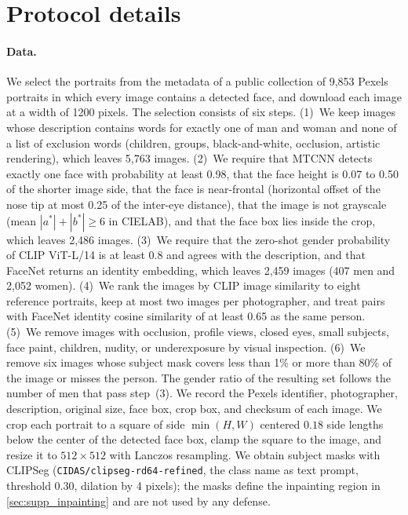 
\section{Protocol details}
\label{sec:supp_protocol}
\paragraph{Data.} We select the portraits from the metadata of a public collection of 9{,}853 Pexels portraits in which every image contains a detected face, and download each image at a width of 1200 pixels. The selection consists of six steps. (1)~We keep images whose description contains words for exactly one of man and woman and none of a list of exclusion words (children, groups, black-and-white, occlusion, artistic rendering), which leaves 5{,}763 images. (2)~We require that MTCNN detects exactly one face with probability at least 0.98, that the face height is 0.07 to 0.50 of the shorter image side, that the face is near-frontal (horizontal offset of the nose tip at most 0.25 of the inter-eye distance), that the image is not grayscale (mean $|a^*| + |b^*| \ge 6$ in CIELAB), and that the face box lies inside the crop, which leaves 2{,}486 images. (3)~We require that the zero-shot gender probability of CLIP ViT-L/14 is at least 0.8 and agrees with the description, and that FaceNet returns an identity embedding, which leaves 2{,}459 images (407 men and 2{,}052 women). (4)~We rank the images by CLIP image similarity to eight reference portraits, keep at most two images per photographer, and treat pairs with FaceNet identity cosine similarity of at least 0.65 as the same person. (5)~We remove images with occlusion, profile views, closed eyes, small subjects, face paint, children, nudity, or underexposure by visual inspection. (6)~We remove six images whose subject mask covers less than 1\% or more than 80\% of the image or misses the person. The gender ratio of the resulting set follows the number of men that pass step~(3). We record the Pexels identifier, photographer, description, original size, face box, crop box, and checksum of each image. We crop each portrait to a square of side $\min(H, W)$ centered $0.18$ side lengths below the center of the detected face box, clamp the square to the image, and resize it to $512\times512$ with Lanczos resampling. We obtain subject masks with CLIPSeg (\texttt{CIDAS/clipseg-rd64-refined}, the class name as text prompt, threshold 0.30, dilation by 4 pixels); the masks define the inpainting region in \cref{sec:supp_inpainting} and are not used by any defense.

